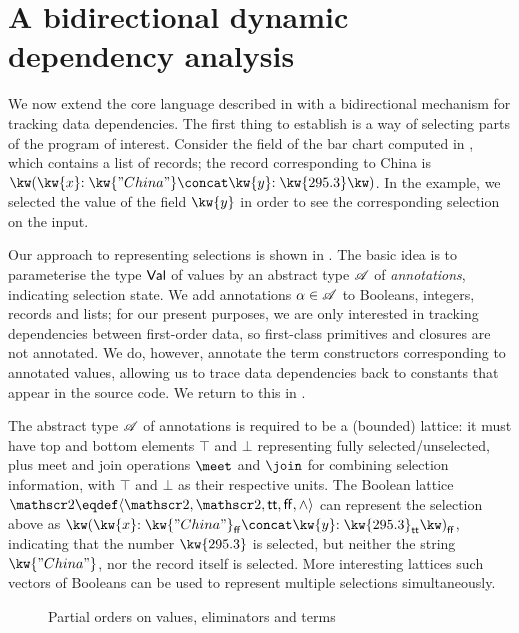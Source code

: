 \section{A bidirectional dynamic dependency analysis}
\label{sec:data-dependencies}

We now extend the core language described in  with a bidirectional mechanism for tracking data dependencies. The first thing to establish is a way of selecting parts of the program of interest. Consider the  field of the bar chart computed in , which contains a list of records; the record corresponding to China is $\exRec{\bind{\kw{x}}{\kw{"China"}} \concat \bind{\kw{y}}{\kw{295.3}}}$. In the example, we selected the value of the field $\kw{y}$ in order to see the corresponding selection on the input.

Our approach to representing selections is shown in . The basic idea is to parameterise the type $\textup{\textsf{Val}}$ of values by an abstract type $\mathscr{A}$ of \emph{annotations}, indicating selection state. We add annotations $\alpha \in \mathscr{A}$ to Booleans, integers, records and lists; for our present purposes, we are only interested in tracking dependencies between first-order data, so first-class primitives and closures are not annotated. We do, however, annotate the term constructors corresponding to annotated values, allowing us to trace data dependencies back to constants that appear in the source code. We return to this in .



The abstract type $\mathscr{A}$ of annotations is required to be a (bounded) lattice: it must have top and bottom elements $\top$ and $\bot$ representing fully selected/unselected, plus meet and join operations $\meet$ and $\join$ for combining selection information, with $\top$ and $\bot$ as their respective units. The Boolean lattice $\Bool \eqdef \Lattice{\Bool}{\TT}{\FF}{\wedge}{\vee}$ can represent the selection above as $\annRec{\bind{\kw{x}}{\annStr{\kw{"China"}}{\FF}} \concat \bind{\kw{y}}{\annInt{\kw{295.3}}{\TT}}}{\FF}$, indicating that the number $\exInt{\kw{295.3}}$ is selected, but neither the string $\exStr{\kw{"China"}}$, nor the record itself is selected. More interesting lattices such vectors of Booleans can be used to represent multiple selections simultaneously.

\begin{figure}
   
   
   \caption{Partial orders on values, eliminators and terms}
   \label{fig:data-dependencies:leq}
\end{figure}



